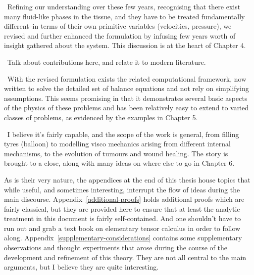 \textbullet\ 
 Refining our understanding over these few years, recognising that
there exist many fluid-like phases in the tissue, and they have to be
treated fundamentally different--in terms of their own primitive
variables (velocities, pressure), we revised and further enhanced the
formulation by infusing few years worth of insight gathered about the
system. This discussion is at the heart of Chapter 4.

\textbullet\ 
 Talk about contributions here, and relate it to modern literature.

\textbullet\ 
 With the revised formulation exists the related computational
framework, now written to solve the detailed set of balance equations
and not rely on simplifying assumptions. This seems promising in that
it demonstrates several basic aspects of the physics of these problems
and has been relatively easy to extend to varied classes of problems,
as evidenced by the examples in Chapter 5.

\textbullet\ 
 I believe it's fairly capable, and the scope of the work is general,
from filling tyres (balloon) to modelling visco mechanics arising from
different internal mechanisms, to  the evolution of tumours and wound
healing. The story is brought to a close, along with many ideas on
where else to go in Chapter 6.

As is their very nature, the appendices at the end of this thesis
house topics that while useful, and sometimes interesting, interrupt
the flow of ideas during the main
discourse. Appendix~\ref{additional-proofs} holds additional proofs
which are fairly classical, but they are provided here to ensure that
at least the analytic treatment in this document is fairly
self-contained. And one shouldn't have to run out and grab a text book
on elementary tensor calculus in order to follow
along. Appendix~\ref{supplementary-considerations} contains some
supplementary observations and thought experiments that arose during
the course of the development and refinement of this theory. They are
not all central to the main arguments, but I believe they are quite
interesting.




